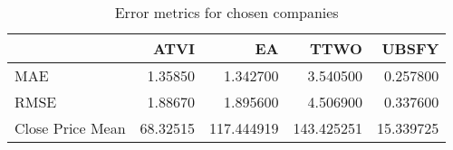 \begin{table}
\centering
\caption{Error metrics for chosen companies}
\begin{tabular}{lrrrr}
\toprule
{} &      ATVI &          EA &        TTWO &      UBSFY \\
\midrule
MAE              &   1.35850 &    1.342700 &    3.540500 &   0.257800 \\
RMSE             &   1.88670 &    1.895600 &    4.506900 &   0.337600 \\
Close Price Mean &  68.32515 &  117.444919 &  143.425251 &  15.339725 \\
\bottomrule
\end{tabular}
\end{table}
